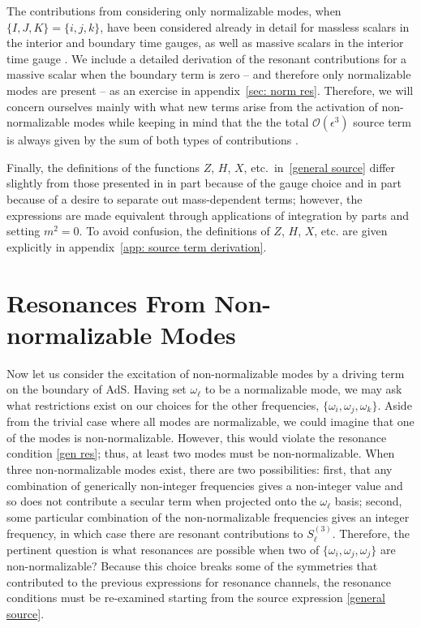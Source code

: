\documentclass[letterpaper,11pt]{article}
\newcommand{\oi}{\omega_i}
\newcommand{\oj}{\omega_j}
\newcommand{\ok}{\omega_k}
\newcommand{\ol}{\omega_\ell}
\newcommand{\mc}{\mathcal}
\begin{document}
The contributions from considering only normalizable modes, when $\{ I, J, K \} = \{i, j ,k\}$,
have been considered already in detail for massless scalars in the interior \cite{1407.6273} 
and boundary \cite{1412.3249} time gauges, as well as massive scalars in the interior time gauge \cite{1810.04753}.
We include a detailed derivation of the resonant contributions for a massive scalar when the boundary term is 
zero -- and therefore only normalizable modes are present -- as an exercise in appendix~\ref{sec: norm res}. 
Therefore, we will concern ourselves mainly with what new terms arise from the activation of non-normalizable 
modes while keeping in mind that the the total $\mc O(\epsilon^3)$ source term is always given 
by the sum of both types of contributions \cite{1810.04753}.

Finally, the definitions of the functions $Z$, $H$, $X$, etc.~in~\eqref{general source} differ slightly 
from those presented in \cite{1407.6273, 1412.3249} in part because of the gauge choice and in part because of 
a desire to separate out mass-dependent terms; however, the expressions are made equivalent through applications 
of integration by parts and setting $m^2 = 0$. To avoid confusion, 
the definitions of $Z$, $H$, $X$, etc. are given explicitly in 
appendix~\ref{app: source term derivation}.




\section{Resonances From Non-normalizable Modes}
\label{sec: NNmodes}

Now let us consider the excitation of non-normalizable modes by a driving term on the boundary of AdS. Having set $\ol$ to be a normalizable mode, we may ask what restrictions exist on our choices for the other frequencies, $\{ \oi, \oj, \ok \}$. Aside from the trivial case where all modes are normalizable, we could imagine that one of the modes is non-normalizable. However, this would violate the resonance condition \eqref{gen res}; thus, at least two modes must be non-normalizable. When three non-normalizable modes exist, there are two possibilities: first, that any combination of generically non-integer frequencies gives a non-integer value and so does not contribute a secular term when projected onto the $\omega_\ell$ basis; second, some particular combination of the non-normalizable frequencies gives an integer frequency, in which case there are resonant contributions to $S^{(3)}_\ell$. Therefore, the pertinent question is what resonances are possible when two of $\{\oi, \oj, \oj\}$ are non-normalizable? Because this choice breaks some of the symmetries that contributed to the previous expressions for resonance channels, the resonance conditions must be re-examined starting from the source expression \eqref{general source}.
\end{document}
